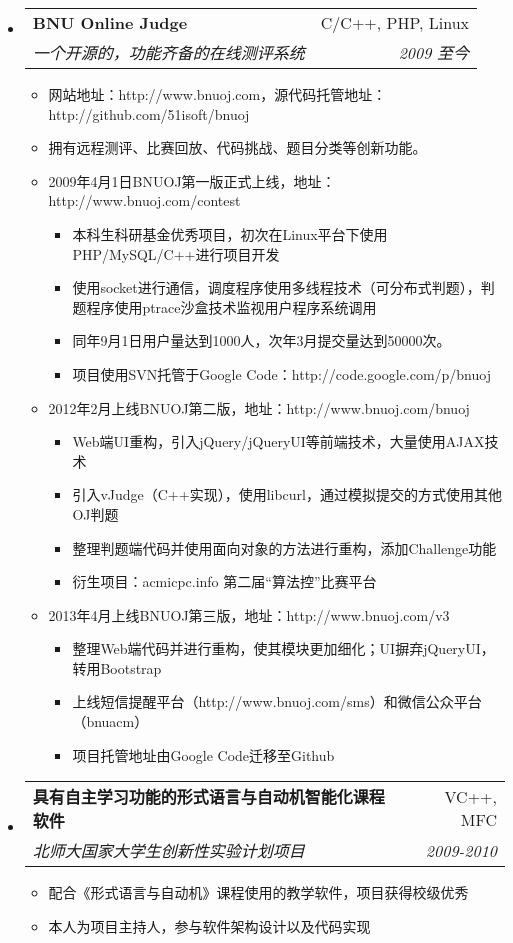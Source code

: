 \documentclass[letterpaper,11pt,UTF8,nofonts]{ctexart}
\makeatletter
\newcommand{\resitem}[1]{\item #1 \vspace{-2pt}}
\newcommand{\ressubheading}[4]{
    \begin{tabular*}{6.5in}{l@{\cftdotfill{\cftsecdotsep}\extracolsep{\fill}}r}
        \textbf{#1} & #2 \\
        \textit{#3} & \textit{#4} \\
    \end{tabular*}\vspace{-6pt}
}
\makeatother
\begin{document}
    \begin{itemize}
        \item
            \ressubheading{BNU Online Judge}{C/C++, PHP, Linux}{一个开源的，功能齐备的在线测评系统}{2009 至今}
            \begin{itemize}
                \resitem{网站地址：http://www.bnuoj.com，源代码托管地址：http://github.com/51isoft/bnuoj}
                \resitem{拥有远程测评、比赛回放、代码挑战、题目分类等创新功能。}
                \resitem{2009年4月1日BNUOJ第一版正式上线，地址：http://www.bnuoj.com/contest}
                \begin{itemize}
                    \resitem{本科生科研基金优秀项目，初次在Linux平台下使用PHP/MySQL/C++进行项目开发}
                    \resitem{使用socket进行通信，调度程序使用多线程技术（可分布式判题），判题程序使用ptrace沙盒技术监视用户程序系统调用}
                    \resitem{同年9月1日用户量达到1000人，次年3月提交量达到50000次。}
                    \resitem{项目使用SVN托管于Google Code：http://code.google.com/p/bnuoj}
                \end{itemize}
                \resitem{2012年2月上线BNUOJ第二版，地址：http://www.bnuoj.com/bnuoj}
                \begin{itemize}
                    \resitem{Web端UI重构，引入jQuery/jQueryUI等前端技术，大量使用AJAX技术}
                    \resitem{引入vJudge（C++实现），使用libcurl，通过模拟提交的方式使用其他OJ判题}
                    \resitem{整理判题端代码并使用面向对象的方法进行重构，添加Challenge功能}
                    \resitem{衍生项目：acmicpc.info 第二届“算法控”比赛平台}
                \end{itemize}
                \resitem{2013年4月上线BNUOJ第三版，地址：http://www.bnuoj.com/v3}
                \begin{itemize}
                    \resitem{整理Web端代码并进行重构，使其模块更加细化；UI摒弃jQueryUI，转用Bootstrap}
                    \resitem{上线短信提醒平台（http://www.bnuoj.com/sms）和微信公众平台（bnuacm）}
                    \resitem{项目托管地址由Google Code迁移至Github}
                \end{itemize}
            \end{itemize}
        \item
            \ressubheading{具有自主学习功能的形式语言与自动机智能化课程软件}{VC++, MFC}{北师大国家大学生创新性实验计划项目}{2009-2010}
            \begin{itemize}
                \resitem{配合《形式语言与自动机》课程使用的教学软件，项目获得校级优秀}
                \resitem{本人为项目主持人，参与软件架构设计以及代码实现}
            \end{itemize}
    \end{itemize}
\end{document}

